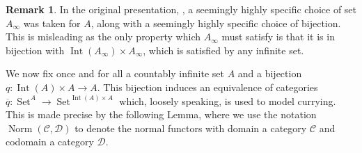 \documentclass[12pt]{article}
\theoremstyle{plain}
\theoremstyle{definition}
\newtheorem{remark}[thm]{Remark}
\newcommand{\call}[1]{\mathcal{#1}}
\newcommand{\lto}{\longrightarrow}
\DeclareMathOperator{\set}{Set}
\begin{document}
\begin{remark}
    In the original presentation, \cite[Proposition 3.1]{Girard}, a seemingly highly specific choice of set $A_\infty$ was taken for $A$, along with a seemingly highly specific choice of bijection. This is misleading as the only property which $A_\infty$ must satisfy is that it is in bijection with $\operatorname{Int}(A_\infty) \times A_\infty$, which is satisfied by any infinite set.
\end{remark}

We now fix once and for all a countably infinite set $A$ and a bijection $q: \operatorname{Int}(A) \times A \lto A$. This bijection induces an equivalence of categories $\overline{q}: \set^A \lto \set^{\operatorname{Int}(A) \times A}$ which, loosely speaking, is used to model currying. This is made precise by the following Lemma, where we use the notation $\operatorname{Norm}(\call{C}, \call{D})$ to denote the normal functors with domain a category $\call{C}$ and codomain a category $\call{D}$.
\end{document}
